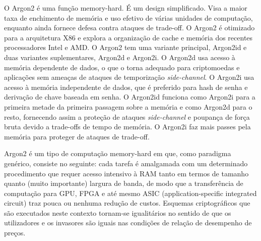 \documentclass[conference]{IEEEtran}
\begin{document}
O Argon2 é uma função memory-hard. É um design simplificado. Visa a maior taxa de 
enchimento de memória e uso efetivo de várias unidades de computação, 
enquanto ainda fornece defesa contra ataques de trade-off. O Argon2 é otimizado 
para a arquitetura X86 e explora a organização de cache e memória dos recentes 
processadores Intel e AMD. O Argon2 tem uma variante principal, Argon2id e 
duas variantes suplementares, Argon2d e Argon2i. O Argon2d usa acesso à memória 
dependente de dados, o que o torna adequado para criptomoedas e aplicações sem ameaças 
de ataques de temporização \textit{side-channel}. O Argon2i usa acesso à memória 
independente de dados, que é preferido para hash de senha e derivação de 
chave baseada em senha. O Argon2id funciona como Argon2i para a primeira metade 
da primeira passagem sobre a memória e como Argon2d para o resto, 
fornecendo assim a proteção de ataques \textit{side-channel} e poupança de 
força bruta devido a trade-offs de tempo de memória. O Argon2i faz mais passes pela memória 
para proteger de ataques de trade-off. \cite{rfc9106}

Argon2 é um tipo de computação memory-hard em que, como paradigma genérico, 
consiste no seguinte: cada tarefa é amalgamada com um determinado procedimento que 
requer acesso intensivo à RAM tanto em termos de tamanho quanto (muito importante) 
largura de banda, de modo que a transferência de computação para GPU, FPGA e até mesmo 
ASIC (application-specific integrated circuit) traz pouca ou nenhuma redução de custos. 
Esquemas criptográficos que são executados neste contexto tornam-se igualitários no 
sentido de que os utilizadores e os invasores são iguais nas condições de relação de 
desempenho de preços. \cite{biryukov2016egalitarian}

\end{document}
